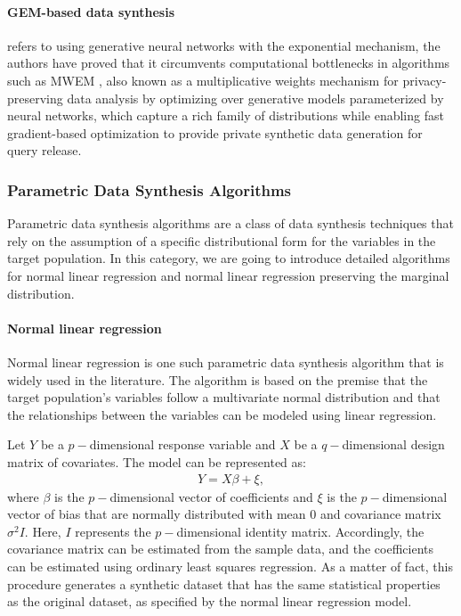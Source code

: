 \paragraph{GEM-based data synthesis}refers to using generative neural networks with the exponential mechanism, the authors have proved that it circumvents computational bottlenecks in algorithms such as MWEM \citep{hardt2010multiplicative}, also known as a multiplicative weights mechanism for privacy-preserving data analysis by optimizing over generative models parameterized by neural networks, which capture a rich family of distributions while enabling fast gradient-based optimization to provide private synthetic data generation for query release.

\subsubsection{Parametric Data Synthesis Algorithms}
\label{subsubsec:para}
Parametric data synthesis algorithms are a class of data synthesis techniques that rely on the assumption of a specific distributional form for the variables in the target population. In this category, we are going to introduce detailed algorithms for normal linear regression and normal linear regression preserving the marginal distribution.

\paragraph{Normal linear regression}
Normal linear regression \citep{su2012linear} is one such parametric data synthesis algorithm that is widely used in the literature. The algorithm is based on the premise that the target population's variables follow a multivariate normal distribution and that the relationships between the variables can be modeled using linear regression.

Let $Y$ be a $p-$dimensional response variable and $X$ be a $q-$dimensional design matrix of covariates. The model can be represented as:
\begin{align}
    \label{equ:lm-org}
    Y=X\beta+\xi,
\end{align}
where $\beta$ is the $p-$dimensional vector of coefficients and $\xi$ is the $p-$dimensional vector of bias that are normally distributed with mean $0$ and covariance matrix $\sigma^2I$. Here, $I$ represents the $p-$dimensional identity matrix. Accordingly, the covariance matrix can be estimated from the sample data, and the coefficients can be estimated using ordinary least squares regression. As a matter of fact, this procedure generates a synthetic dataset that has the same statistical properties as the original dataset, as specified by the normal linear regression model.

